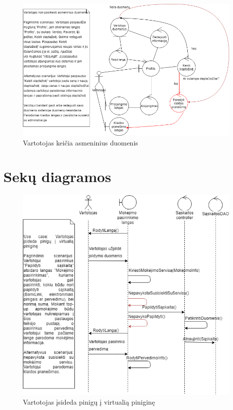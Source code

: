 \documentclass[oneside]{VUMIFPSkursinis}
\begin{document}
			\begin{figure}[h]
    				\centering
    				\includegraphics[width=1\textwidth]{rob14.png}
    				\caption{Vartotojas keičia asmeninius duomenis}
    				\label{fig:Vartotojas keičia asmeninius duomenis}
			\end{figure}

\section{Sekų diagramos}
			\begin{figure}[h]
    				\centering
    				\includegraphics[width=1\textwidth]{seq1.png}
    				\caption{Vartotojas įsideda pinigų į virtualią piniginę}
    				\label{fig:Vartotojas įsideda pinigų į virtualią piniginę}
			\end{figure}
\end{document}
